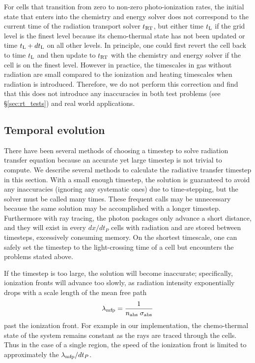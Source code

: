 \documentclass[apj,onecolumn]{emulateapj}
\begin{document}
For cells that transition from zero to non-zero photo-ionization
rates, the initial state that enters into the chemistry and energy
solver does not correspond to the current time of the radiation
transport solver $t_{\rm RT}$, but either time $t_{\rm L}$ if the grid
level is the finest level because its chemo-thermal state has not been
updated or time $t_{\rm L}+dt_{\rm L}$ on all other levels.  In
principle, one could first revert the cell back to time $t_{\rm L}$
and then update to $t_{\rm RT}$ with the chemistry and energy solver
if the cell is on the finest level.  However in practice, the
timescales in gas without radiation are small compared to the
ionization and heating timescales when radiation is introduced.
Therefore, we do not perform this correction and find that this does
not introduce any inaccuracies in both test problems (see
\S\ref{sec:rt_tests}) and real world applications.


\subsection{Temporal evolution}
\label{sec:timestepping}

There have been several methods of choosing a timestep to solve
radiation transfer equation because an accurate yet large timestep is
not trivial to compute.  We describe several methods to calculate the
radiative transfer timestep in this section.  With a small enough
timestep, the solution is guaranteed to avoid any inaccuracies
(ignoring any systematic ones) due to time-stepping, but the solver
must be called many times.  These frequent calls may be unnecessary
because the same solution may be accomplished with a longer timestep.
Furthermore with ray tracing, the photon packages only advance a short
distance, and they will exist in every $dx/dt_P$ cells with radiation
and are stored between timesteps, excessively consuming memory.  On
the shortest timescale, one can safely set the timestep to the
light-crossing time of a cell \citep{Abel99_RT, Trac07} but encounters
the problems stated above.

If the timestep is too large, the solution will become inaccurate;
specifically, ionization fronts will advance too slowly, as radiation
intensity exponentially drops with a scale length of the mean free
path
\begin{equation}
  \label{eqn:mfp}
  \lambda_{\rm mfp} = \frac{1}{n_{\rm abs} \; \sigma_{\rm abs}}
\end{equation}
past the ionization front.  For example in our implementation, the
chemo-thermal state of the system remains constant as the rays are
traced through the cells.  Thus in the case of a single 
region, the speed of the ionization front is limited to approximately
the $\lambda_{\rm mfp} / dt_P$.
\end{document}
